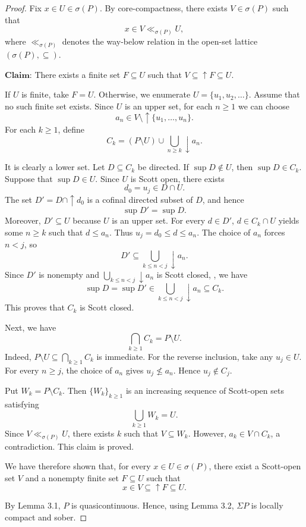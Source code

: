 \documentclass[preprint,12pt]{elsarticle}
\numberwithin{equation}{section}
\begin{document}
\begin{proof} Fix $x\in U\in\sigma(P)$. By core-compactness, there exists
$V\in\sigma(P)$ such that
$$
x\in V\ll_{\sigma(P)}U,
$$
where $\ll_{\sigma(P)}$ denotes the way-below relation in the
open-set lattice $(\sigma(P),\subseteq)$.

$\mathbf{Claim}$: There exists a finite set $F\subseteq U$ such that $V\subseteq\uparrow F\subseteq U$.

If $U$ is finite, take $F=U$. Otherwise, we enumerate $U=\{u_1,u_2,\ldots\}$.
Assume that no such finite set exists.
Since $U$ is an upper set, for each $n\geq1$ we can choose
$$
a_n\in V\setminus\uparrow\{u_1,\ldots,u_n\}.
$$
For each $k\geq1$, define
$$
C_k=(P\setminus U)\cup\bigcup_{n\geq k}\downarrow a_n.
$$

It is clearly a lower set. Let $D\subseteq C_k$ be directed.
If $\sup D\notin U$, then $\sup D\in C_k$.
Suppose that $\sup D\in U$. Since $U$ is Scott open,
there exists
$$
d_0=u_j\in D\cap U.
$$
The set $D'=D\cap\uparrow d_0$ is a cofinal directed subset
of $D$, and hence
$$
\sup D'=\sup D.
$$
Moreover, $D'\subseteq U$ because $U$ is an upper set.
For every $d\in D'$,  $d\in C_k\cap U$ yields
some $n\geq k$ such that $d\leq a_n$.
Thus $u_j=d_0\leq d\leq a_n$.
The choice of $a_n$ forces $n<j$, so
$$
D'\subseteq\bigcup_{k\leq n<j}\downarrow a_n.
$$
Since $D'$ is nonempty and $\bigcup\limits_{k\leq n<j}\downarrow a_n$ is Scott closed,
, we have
$$
\sup D=\sup D'
\in\bigcup_{k\leq n<j}\downarrow a_n
\subseteq C_k.
$$
This proves that $C_k$ is Scott closed.

Next, we have
$$
\bigcap_{k\geq1}C_k=P\setminus U.
$$
Indeed, $P\setminus U\subseteq\bigcap_{k\geq1}C_k$ is immediate.
For the reverse inclusion, take any $u_j\in U$.
For every $n\geq j$, the choice of $a_n$ gives
$u_j\nleq a_n$. Hence $u_j\notin C_j$.

Put $W_k=P\setminus C_k$.
Then $\{W_k\}_{k\geq1}$ is an increasing sequence of Scott-open
sets satisfying
$$
\bigcup_{k\geq1}W_k=U.
$$
Since $V\ll_{\sigma(P)}U$, there exists $k$ such that
$V\subseteq W_k$. However, $a_k\in V\cap C_k$, a contradiction.
This claim is proved.

We have therefore shown that, for every $x\in U\in\sigma(P)$,
there exist a Scott-open set $V$ and a nonempty finite set
$F\subseteq U$ such that
$$
x\in V\subseteq\uparrow F\subseteq U.
$$

By Lemma 3.1, $P$ is quasicontinuous. Hence, using Lemma 3.2, $\Sigma P$ is locally compact and sober.
\end{proof}
\end{document}
